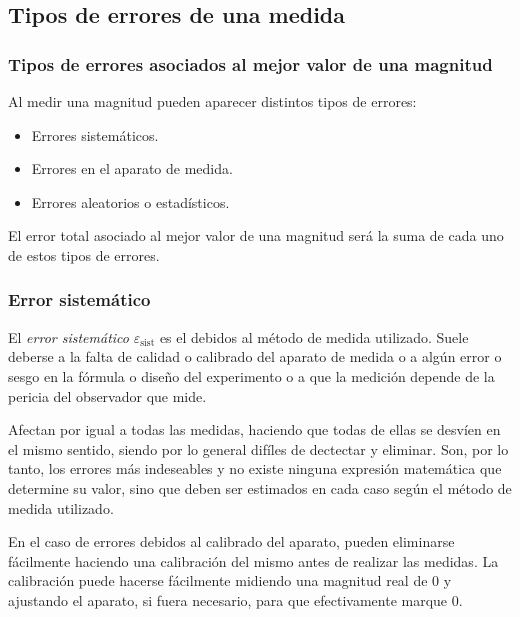 \subsection{Tipos de errores de una medida}
\begin{frame}
\frametitle{Tipos de errores asociados al mejor valor de una magnitud}
Al medir una magnitud pueden aparecer distintos tipos de errores:
\begin{itemize}
\item Errores sistemáticos.
\item Errores en el aparato de medida.
\item Errores aleatorios o estadísticos.
\end{itemize}
El error total asociado al mejor valor de una magnitud será la suma de cada uno de estos tipos de errores. 
\end{frame}


\begin{frame}
\frametitle{Error sistemático}
El \emph{error sistemático} $\varepsilon_{\textrm{sist}}$ es el debidos al método de medida utilizado. Suele
deberse a la falta de calidad o calibrado del aparato de medida o a algún error o sesgo en la fórmula o diseño del
experimento o a que la medición depende de la pericia del observador que mide.

Afectan por igual a todas las medidas, haciendo que todas de ellas se desvíen en el mismo sentido, siendo por lo
general difíles de dectectar y eliminar. Son, por lo tanto, los errores más indeseables y no existe ninguna expresión
matemática que determine su valor, sino que deben ser estimados en cada caso según el método de medida utilizado.

En el caso de errores debidos al calibrado del aparato, pueden eliminarse fácilmente haciendo una calibración del mismo
antes de realizar las medidas. La calibración puede hacerse fácilmente midiendo una magnitud real de 0 y ajustando el
aparato, si fuera necesario, para que efectivamente marque 0. 
\end{frame}


